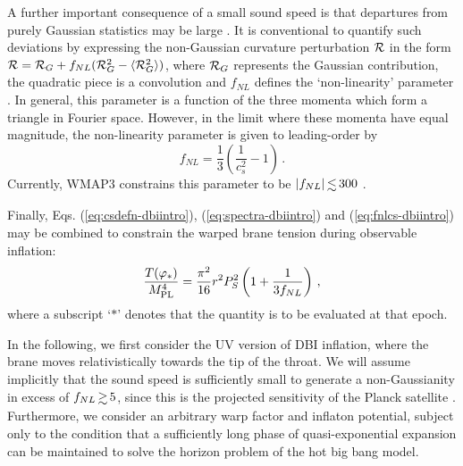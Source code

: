 A further important consequence of a small sound speed is that departures  
from purely Gaussian statistics may be large 
\cite{brane6,brane11,lidser3,chenetal}. 
It is conventional 
to quantify such deviations by expressing the non-Gaussian curvature 
perturbation ${\cal{R}}$ in the form 
${\cal{R}} ={\cal{R}}_G+f_{NL}
({\cal{R}}^2_G -\langle {\cal{R}}^2_G \rangle)$, where 
${\cal{R}}_G$ represents the Gaussian contribution, 
the quadratic piece is a convolution and $f_{NL}$ defines 
the `non-linearity' parameter \cite{maldacena}. 
In general, this parameter is a function of the three momenta which 
form a triangle in Fourier space. However, in the limit where 
these momenta have equal magnitude, the non-linearity parameter 
is given to leading-order by \cite{chenetal,lidser2}  
% 
\begin{equation}
\label{eq:fnlcs-dbiintro}
f_{NL} = \frac{1}{3} \left( \frac{1}{c_s^2} -1 \right) \,.
\end{equation}
% 
Currently, WMAP3 constrains this parameter  
to be ${| f_{NL} |} \, {\lsim} \, {300}$ \cite{spergel,crim}.  


Finally, Eqs. (\ref{eq:csdefn-dbiintro}), (\ref{eq:spectra-dbiintro}) and (\ref{eq:fnlcs-dbiintro}) 
may be combined to constrain the warped brane tension 
during observable inflation: 
% 
\begin{equation}
\label{eq:obswarp-dbiintro}
\frac{T (\varphi_*)}{M_{\mathrm{PL}}^4}  = 
\frac{\pi^2}{16} r^2P_S^2 \left( 1+\frac{1}{3f_{NL}} \right) \,,
\end{equation}
% 
where a subscript `$*$' denotes that the quantity is to be evaluated 
at that epoch. 


In the following, we first consider the UV version of DBI inflation,
where the brane moves relativistically 
towards the tip of the throat. We will assume implicitly 
that the sound speed is sufficiently small to generate a non-Gaussianity in 
excess of $f_{NL} \, {\gsim} \, 5$, since this is the projected 
sensitivity of the Planck satellite \cite{planck}. Furthermore, we consider   
an arbitrary warp factor and inflaton potential, 
subject only to the condition that a sufficiently long phase of 
quasi-exponential expansion can be maintained to solve the horizon problem of
the hot big bang model. 
% 
%

